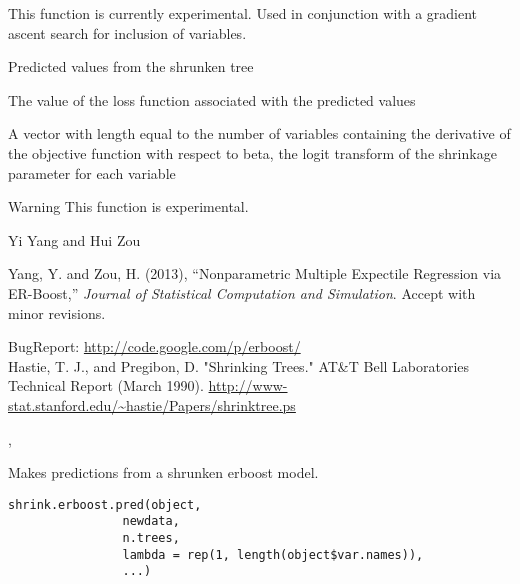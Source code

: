 \documentclass[a4paper]{book}
\begin{document}
%
\begin{Details}\relax
This function is currently experimental. Used in conjunction with a gradient ascent search for inclusion of variables.
\end{Details}
%
\begin{Value}
\begin{ldescription}
\item[\code{predF}] Predicted values from the shrunken tree
\item[\code{objective}] The value of the loss function associated with the predicted values
\item[\code{gradient}] A vector with length equal to the number of variables containing the derivative of the objective function with respect to beta, the logit transform of the shrinkage parameter for each variable
\end{ldescription}
\end{Value}
%
\begin{Section}{Warning}
This function is experimental.
\end{Section}
%
\begin{Author}\relax
 Yi Yang  and Hui Zou  
\end{Author}
%
\begin{References}\relax
 
Yang, Y. and Zou, H. (2013), ``Nonparametric Multiple Expectile Regression via ER-Boost,'' \emph{Journal of Statistical Computation and Simulation}. Accept with minor revisions.

BugReport: \url{http://code.google.com/p/erboost/}\\{}
Hastie, T. J., and Pregibon, D. "Shrinking Trees." AT\&T Bell Laboratories Technical Report (March 1990). \url{http://www-stat.stanford.edu/~hastie/Papers/shrinktree.ps} 
\end{References}
%
\begin{SeeAlso}\relax
 ,  
\end{SeeAlso}
%
\begin{Description}\relax
Makes predictions from a shrunken erboost model.
\end{Description}
%
\begin{Usage}
\begin{verbatim}
shrink.erboost.pred(object, 
                newdata, 
                n.trees, 
                lambda = rep(1, length(object$var.names)), 
                ...)
\end{verbatim}
\end{Usage}
\end{document}
